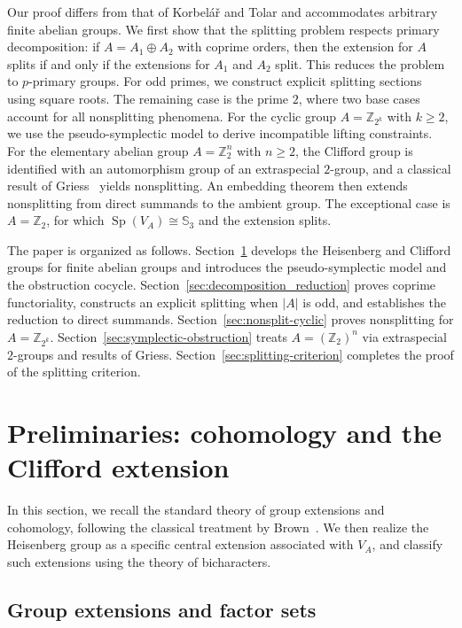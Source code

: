 \documentclass[11pt, reqno]{amsart}
\theoremstyle{definition}
\theoremstyle{remark}
\newcommand{\Z}{\mathbb{Z}}
\DeclareMathOperator{\Sp}{Sp}
\begin{document}
Our proof differs from that of Korbe\-l\'a\v{r} and Tolar and accommodates arbitrary finite abelian groups. We first show that the splitting problem respects primary decomposition: if $A = A_1 \oplus A_2$ with coprime orders, then the extension for $A$ splits if and only if the extensions for $A_1$ and $A_2$ split. This reduces the problem to $p$-primary groups. For odd primes, we construct explicit splitting sections using square roots. The remaining case is the prime $2$, where two base cases account for all nonsplitting phenomena. For the cyclic group $A = \Z_{2^k}$ with $k \geq 2$, we use the pseudo-symplectic model to derive incompatible lifting constraints. For the elementary abelian group $A = \Z_2^n$ with $n \geq 2$, the Clifford group is identified with an automorphism group of an extraspecial $2$-group, and a classical result of Griess~\cite{Griess1973} yields nonsplitting. An embedding theorem then extends nonsplitting from direct summands to the ambient group. The exceptional case is $A = \Z_2$, for which $\Sp(V_A) \cong \mathbb{S}_3$ and the extension splits.

The paper is organized as follows. Section~\ref{sec:prelim} develops the Heisenberg and Clifford groups for finite abelian groups and introduces the pseudo-symplectic model and the obstruction cocycle. Section~\ref{sec:decomposition_reduction} proves coprime functoriality, constructs an explicit splitting when $|A|$ is odd, and establishes the reduction to direct summands. Section~\ref{sec:nonsplit-cyclic} proves nonsplitting for $A=\Z_{2^k}$. Section~\ref{sec:symplectic-obstruction} treats $A=(\Z_2)^n$ via extraspecial $2$-groups and results of Griess. Section~\ref{sec:splitting-criterion} completes the proof of the splitting criterion.


\section{Preliminaries: cohomology and the Clifford extension}\label{sec:prelim}


In this section, we recall the standard theory of group extensions and cohomology, following the classical treatment by Brown~\cite{Brown1982}. We then realize the Heisenberg group as a specific central extension associated with $V_A$, and classify such extensions using the theory of bicharacters.
\subsection{Group extensions and factor sets}
\end{document}
